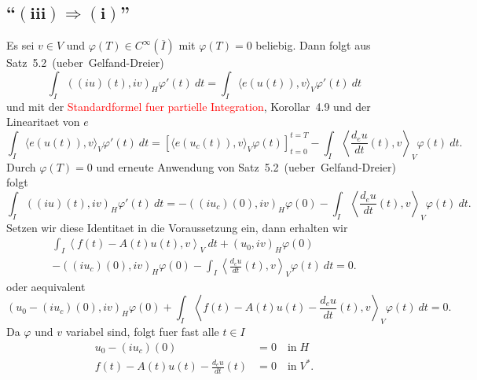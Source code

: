 \documentclass{article}
\begin{document}
\subsection*{``$\bm{(iii) \Rightarrow (i)}$''}

Es sei $v \in V$ und $\varphi(T) \in C^\infty(\overline{I})$ mit $\varphi(T) = 0$ beliebig. Dann folgt aus Satz~5.2~(ueber~Gelfand-Dreier)
\begin{equation*}
  \int_{I} {((iu)(t), iv)}_H \varphi'(t) \ dt
  = \int_{I} {\langle e(u(t)), v \rangle}_V \varphi'(t) \ dt
\end{equation*}
und mit der \textcolor{red}{Standardformel fuer partielle Integration}, Korollar~4.9 und der Linearitaet von $e$
\begin{equation*}
  \int_{I} {\langle e(u(t)), v \rangle}_V \varphi'(t) \ dt
  = {[\langle e(u_c(t)), v \rangle_V \varphi(t)]}_{t=0}^{t=T} - \int_{I} {\left\langle \frac{d_e u}{dt} (t), v \right\rangle}_V \varphi(t) \ dt.
\end{equation*}
Durch $\varphi(T) = 0$ und erneute Anwendung von Satz~5.2~(ueber~Gelfand-Dreier) folgt
\begin{equation*}
  \int_{I} {((iu)(t), iv)}_H \varphi'(t) \ dt
  = - {((iu_c)(0), iv)}_H \varphi(0) - \int_{I} {\left\langle \frac{d_e u}{dt} (t), v \right\rangle}_V \varphi(t) \ dt.
\end{equation*}
Setzen wir diese Identitaet in die Voraussetzung ein, dann erhalten wir
\begin{multline*}
  \int_{I} {\left\langle f(t) - A(t) u(t), v \right\rangle}_V \ dt
  + {(u_0, iv)}_H \varphi(0)\\
  - {((iu_c)(0), iv)}_H \varphi(0) - \int_{I} {\left\langle \frac{d_e u}{dt} (t), v \right\rangle}_V \varphi(t) \ dt
  = 0.
\end{multline*}
oder aequivalent
\begin{equation*}
  {(u_0 - (iu_c)(0), iv)}_H \varphi(0) + \int_{I} {\left\langle f(t) - A(t)u(t) - \frac{d_e u}{dt} (t), v \right\rangle}_V \varphi(t) \ dt
  = 0.
\end{equation*}
Da $\varphi$ und $v$ variabel sind, folgt fuer fast alle $t \in I$
\begin{equation*}
  \begin{aligned}
    u_0 - (iu_c)(0) &= 0 \quad \text{in} \; H\\
    f(t) - A(t)u(t) - \frac{d_e u}{dt} (t) &= 0 \quad \text{in} \; V^*.
  \end{aligned}
\end{equation*}
\end{document}
